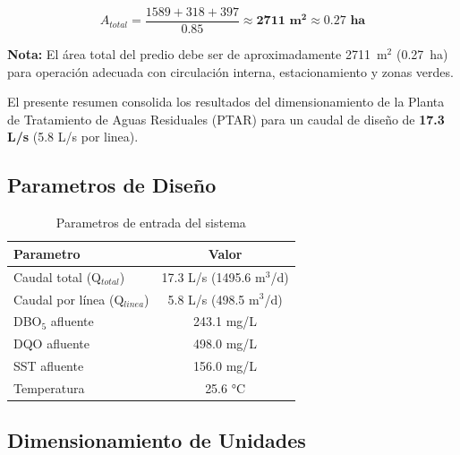 \documentclass[12pt,a4paper]{article}
\begin{document}
\begin{equation}
A_{total} = \frac{1589 + 318 + 397}{0.85} \approx \mathbf{2711 \text{ m}^2} \approx \mathbf{0.27 \text{ ha}}
\end{equation}

\textbf{Nota:} El área total del predio debe ser de aproximadamente 2711~m$^2$ (0.27~ha) para operación adecuada con circulación interna, estacionamiento y zonas verdes.

\newpage



El presente resumen consolida los resultados del dimensionamiento de la Planta de Tratamiento de Aguas Residuales (PTAR) para un caudal de dise\~no de \textbf{17.3 L/s} (5.8 L/s por linea).

\subsection{Parametros de Dise\~no}

\begin{table}[H]
\centering
\caption{Parametros de entrada del sistema}
\begin{tabular}{lc}
\toprule
\textbf{Parametro} & \textbf{Valor} \\
\midrule
Caudal total (Q$_{total}$) & 17.3 L/s (1495.6 m$^3$/d) \\
Caudal por línea (Q$_{linea}$) & 5.8 L/s (498.5 m$^3$/d) \\
DBO$_5$ afluente & 243.1 mg/L \\
DQO afluente & 498.0 mg/L \\
SST afluente & 156.0 mg/L \\
Temperatura & 25.6 °C \\
\bottomrule
\end{tabular}
\end{table}

\subsection{Dimensionamiento de Unidades}
\end{document}
